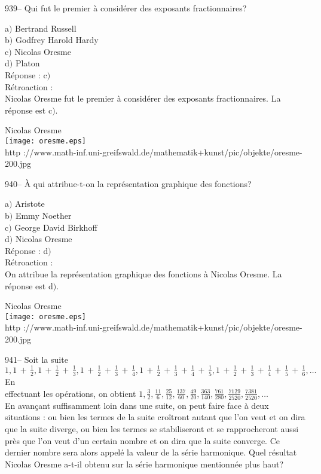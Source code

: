 ﻿\documentclass[letterpaper, 12pt]{article}
\begin{document}
939-- Qui fut le premier \`a consid\'erer des exposants
fractionnaires?

a$)$ Bertrand Russell \\
b$)$ Godfrey Harold Hardy \\
c$)$ Nicolas Oresme \\
d$)$ Platon\\

R\'eponse : c$)$\\

R\'etroaction : \\
Nicolas Oresme fut le premier \`a consid\'erer des exposants
fractionnaires. La r\'eponse est c$)$.\\

        \begin{center}
        Nicolas Oresme\\
    \texttt{[image: oresme.eps]}\\
        {\footnotesize http
://www.math-inf.uni-greifswald.de/mathematik+kunst/pic/objekte/oresme-200.jpg}
    \end{center}

940-- \`A qui attribue-t-on la repr\'esentation graphique des
fonctions?

a$)$ Aristote \\
b$)$ Emmy Noether \\
c$)$ George David Birkhoff \\
d$)$ Nicolas Oresme\\

R\'eponse : d$)$\\

R\'etroaction : \\
On attribue la repr\'esentation graphique des fonctions \`a Nicolas Oresme.
La r\'eponse est d$)$.\\

        \begin{center}
        Nicolas Oresme\\
    \texttt{[image: oresme.eps]}\\
        {\footnotesize http
://www.math-inf.uni-greifswald.de/mathematik+kunst/pic/objekte/oresme-200.jpg}
    \end{center}

941-- Soit la suite
$1,1\,+\,\frac12,1\,+\,\frac12\,+\,\frac13,1\,+\,\frac12\,+\,\frac13\,+\,\frac14,1\,+\,\frac12\,+\,\frac13\,+\,\frac14\,+\,\frac15,
1\,+\,\frac12\,+\,\frac13\,+\,\frac14\,+\,\frac15\,+\,\frac16,\ldots$ En \\
[2mm] effectuant les op\'erations, on obtient
$1,\frac32,\frac{11}6,\frac{25}{12},\frac{137}{60},\frac{49}{20},
\frac{363}{140},\frac{761}{280},\frac{7129}{2520},\frac{7381}{2520},\ldots$
\\ [2mm] En avan\c cant suffisamment loin dans une suite, on peut
faire face \`a deux situations : ou bien les termes de la suite
cro\^itront autant que l'on veut et on dira que la suite diverge, ou
bien les termes se stabiliseront et se rapprocheront aussi pr\`es
que l'on veut d'un certain nombre et on dira que la suite converge.
Ce dernier nombre sera alors appel\'e la valeur de la s\'erie
harmonique. Quel r\'esultat Nicolas Oresme a-t-il obtenu sur la
s\'erie harmonique mentionn\'ee plus haut?
\end{document}
